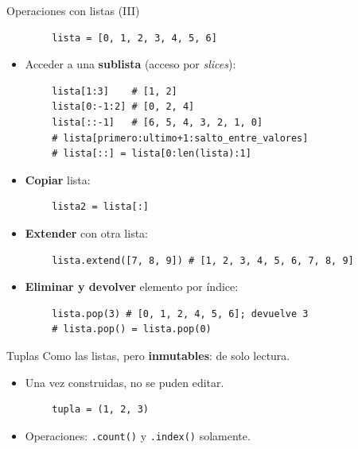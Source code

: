 \documentclass[10pt]{beamer} %
\begin{document}
\begin{frame}[fragile]{Operaciones con listas (III)}
    \begin{verbatim}
        lista = [0, 1, 2, 3, 4, 5, 6]
    \end{verbatim}
    \begin{itemize}
        \item Acceder a una \textbf{sublista} (acceso por \textit{slices}):
    \end{itemize}
    \begin{verbatim}
        lista[1:3]    # [1, 2]
        lista[0:-1:2] # [0, 2, 4]
        lista[::-1]   # [6, 5, 4, 3, 2, 1, 0]
        # lista[primero:ultimo+1:salto_entre_valores]
        # lista[::] = lista[0:len(lista):1]
    \end{verbatim}
    \begin{itemize}
        \item \textbf{Copiar} lista:
    \end{itemize}
    \begin{verbatim}
        lista2 = lista[:]
    \end{verbatim}
    \begin{itemize}
        \item \textbf{Extender} con otra lista:
    \end{itemize}
    \begin{verbatim}
        lista.extend([7, 8, 9]) # [1, 2, 3, 4, 5, 6, 7, 8, 9]
    \end{verbatim}
    \begin{itemize}
        \item \textbf{Eliminar y devolver} elemento por índice:
    \end{itemize}
    \begin{verbatim}
        lista.pop(3) # [0, 1, 2, 4, 5, 6]; devuelve 3
        # lista.pop() = lista.pop(0)
    \end{verbatim}
\end{frame}

\begin{frame}[fragile]{Tuplas}
    Como las listas, pero \textbf{inmutables}: de solo lectura.
    \begin{itemize}
        \item Una vez construidas, no se puden editar.
    \end{itemize}
    \begin{verbatim}
        tupla = (1, 2, 3)
    \end{verbatim}
    \begin{itemize}
        \item Operaciones: \texttt{.count()} y \texttt{.index()} solamente.
    \end{itemize}
\end{frame}
\end{document}
